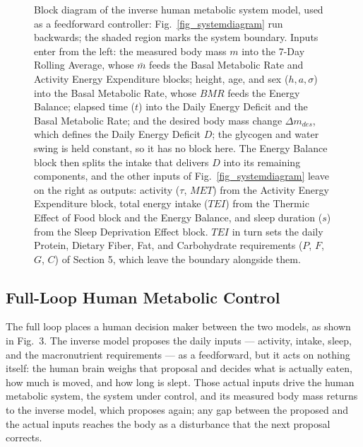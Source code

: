 \begin{figure}[htbp]
\begin{tikzpicture}
\end{tikzpicture}
\caption[Block diagram of the inverse human metabolic system model.]{Block diagram of the inverse human metabolic system model, used as a feedforward controller: Fig.~\ref{fig_systemdiagram} run backwards; the shaded region marks the system boundary. Inputs enter from the left: the measured body mass $m$ into the 7-Day Rolling Average, whose $\bar{m}$ feeds the Basal Metabolic Rate and Activity Energy Expenditure blocks; height, age, and sex ($h, a, \sigma$) into the Basal Metabolic Rate, whose $BMR$ feeds the Energy Balance; elapsed time ($t$) into the Daily Energy Deficit and the Basal Metabolic Rate; and the desired body mass change $\Delta m_{des}$, which defines the Daily Energy Deficit $D$; the glycogen and water swing is held constant, so it has no block here. The Energy Balance block then splits the intake that delivers $D$ into its remaining components, and the other inputs of Fig.~\ref{fig_systemdiagram} leave on the right as outputs: activity ($\tau$, $MET$) from the Activity Energy Expenditure block, total energy intake ($TEI$) from the Thermic Effect of Food block and the Energy Balance, and sleep duration ($s$) from the Sleep Deprivation Effect block. $TEI$ in turn sets the daily Protein, Dietary Fiber, Fat, and Carbohydrate requirements ($P$, $F$, $G$, $C$) of Section 5, which leave the boundary alongside them.}
\label{fig_inversediagram}
\end{figure}

\subsection{Full-Loop Human Metabolic Control}

The full loop places a human decision maker between the two models, as shown in Fig.~3. The inverse model proposes the daily inputs — activity, intake, sleep, and the macronutrient requirements — as a feedforward, but it acts on nothing itself: the human brain weighs that proposal and decides what is actually eaten, how much is moved, and how long is slept. Those actual inputs drive the human metabolic system, the system under control, and its measured body mass returns to the inverse model, which proposes again; any gap between the proposed and the actual inputs reaches the body as a disturbance that the next proposal corrects.

